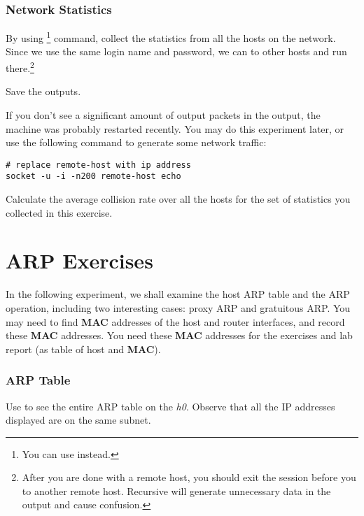 \documentclass{../UTNetLab}
\begin{document}
\section{Network Statistics}
By using \footnote{You can use  instead.} command, collect the statistics from all the hosts on the network.
Since we use the same login name and password, we can  to other hosts and run  there.\footnote{%
    After you are done with a remote host, you should exit the  session before you  to another remote host.
    Recursive  will generate unnecessary data in the  output and cause confusion.
}

Save the  outputs.

If you don’t see a significant amount of output packets in the  output, the machine was probably restarted recently.
You may do this experiment later, or use the following  command to generate some network traffic:
\begin{lstlisting}[emph={remote-host},morekeywords={[3]echo}]
# replace remote-host with ip address
socket -u -i -n200 remote-host echo
    \end{lstlisting}

\begin{report}
    \item Calculate the average collision rate over all the hosts for the set of statistics you collected in this exercise.
\end{report}

\part{ARP Exercises}
In the following experiment, we shall examine the host ARP table and the ARP operation, including two interesting cases: proxy ARP and gratuitous ARP.
You may need to find \textbf{MAC} addresses of the host and router interfaces, and record these \textbf{MAC} addresses.
You need these \textbf{MAC} addresses for the exercises and lab report (as table of host and \textbf{MAC}).

\section{ARP Table}
Use  to see the entire ARP table on the \textit{h0}.
Observe that all the IP addresses displayed are on the same subnet.
\end{document}

